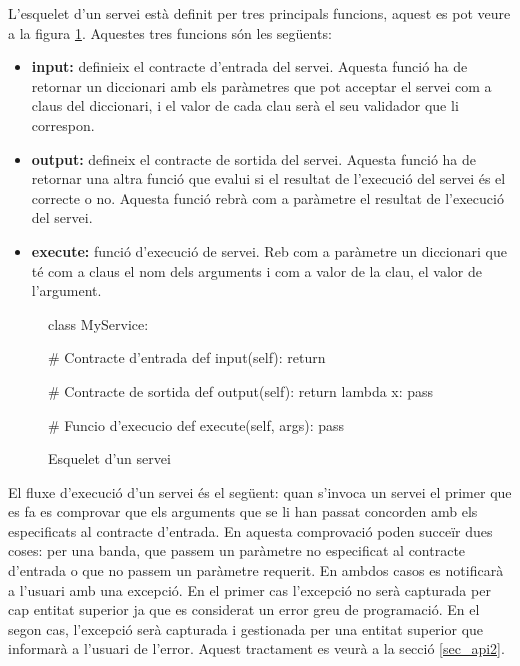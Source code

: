 	L'esquelet d'un servei està definit per tres principals funcions, aquest es pot veure a la figura \ref{fig:esquelet_servei}. Aquestes tres funcions són les següents:
	
	\begin{itemize}
		\item \textbf{input:} definieix el contracte d'entrada del servei. Aquesta funció ha de retornar un diccionari amb els paràmetres que pot acceptar el servei com a claus del diccionari, i el valor de cada clau serà el seu validador que li correspon.
		 
		\item \textbf{output:} defineix el contracte de sortida del servei. Aquesta funció ha de retornar una altra funció que evalui si el resultat de l'execució del servei és el correcte o no. Aquesta funció rebrà com a paràmetre el resultat de l'execució del servei.
		
		\item \textbf{execute:} funció d'execució de servei. Reb com a paràmetre un diccionari que té com a claus el nom dels arguments i com a valor de la clau, el valor de l'argument.
	\end{itemize}
	
	\begin{figure}[h!]
		\begin{python}
class MyService:
	
	# Contracte d'entrada
	def input(self):
		return {}
	
	# Contracte de sortida
	def output(self):
		return lambda x: pass
		
	# Funcio d'execucio
	def execute(self, args):
		pass
		\end{python}
		\caption{Esquelet d'un servei}
		\label{fig:esquelet_servei}
	\end{figure}
	
	El fluxe d'execució d'un servei és el següent: quan s'invoca un servei el primer que es fa es comprovar que els arguments que se li han passat concorden amb els especificats al contracte d'entrada.  En aquesta comprovació poden succeïr dues coses: per una banda, que passem un paràmetre no especificat al contracte d'entrada o que no passem un paràmetre requerit. En ambdos casos es notificarà a l'usuari amb una excepció. En el primer cas l'excepció no serà capturada per cap entitat superior ja que es considerat un error greu de programació. En el segon cas, l'excepció serà capturada i gestionada per una entitat superior que informarà a l'usuari de l'error. Aquest tractament es veurà a la secció \ref{sec_api2}.\\
	
